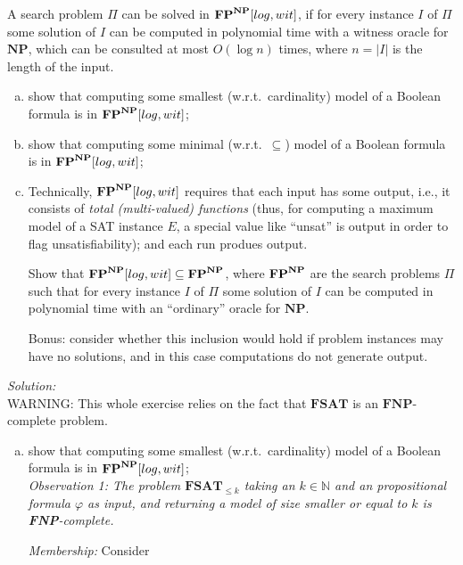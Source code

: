 \documentclass[11pt,a4paper]{article}
\newcommand{\NP}{\ensuremath{\mathbf{NP}}\xspace}
\newcommand{\FPol}{\ensuremath{\protect\mathbf{FP}}\xspace}
\newcommand{\FPNP}{\ensuremath{\FPol^{\NP}}\xspace}
\newcommand{\FPNPlogwit}{\ensuremath{\FPol^{\NP}[log, wit]}\xspace}
\begin{document}
\begin{enumerate}
A search problem $\Pi$ can be solved in $\FPNPlogwit$, if for
every instance $I$ of $\Pi$  some solution of $I$ can be computed in
polynomial time with a witness oracle for $\NP$, which can be consulted
at most $O(\log n)$ times, where $n=|I|$ is the length of the input.

\begin{enumerate}[(a)]
 \item show that computing some smallest (w.r.t.\ cardinality) model  of a
        Boolean formula is in $\FPNPlogwit$;
 \item show that computing some minimal (w.r.t.\ $\subseteq$) model of a
        Boolean formula is in $\FPNPlogwit$;
        
 \item Technically, $\FPNPlogwit$ requires that each input has some
 output, i.e., it consists of \emph{total (multi-valued) functions}\/ (thus, for computing a
 maximum model of a SAT instance $E$, a special value like ``unsat''
 is output in order to flag unsatisfiability); and each run produes output.

Show that $\FPNPlogwit \subseteq \FPNP$, where $\FPNP$ are the 
search problems $\Pi$ such that for
every instance $I$ of $\Pi$ some solution of $I$ can be computed in
polynomial time with an ``ordinary'' oracle for $\NP$.

Bonus: consider whether this inclusion would hold if problem instances
may have no solutions, and in this case computations do not generate output.
\end{enumerate}


\bigskip

\emph{Solution:}\\

WARNING: This whole exercise relies on the fact that $\mathbf{FSAT}$ is an $\mathbf{FNP}$-complete problem. 

\begin{enumerate}[(a)]
 \item show that computing some smallest (w.r.t.\ cardinality) model  of a
        Boolean formula is in $\FPNPlogwit$; \\
        
        
        
\emph{Observation 1: The problem $\textbf{FSAT}_{\leq k}$ taking an $k\in \mathbb{N}$ and an propositional formula $\varphi$ as input,  and returning a model of size smaller or equal to $k$ is \textbf{FNP}-complete. }

\emph{Membership:} Consider


\end{enumerate}
\end{enumerate}
\end{document}
